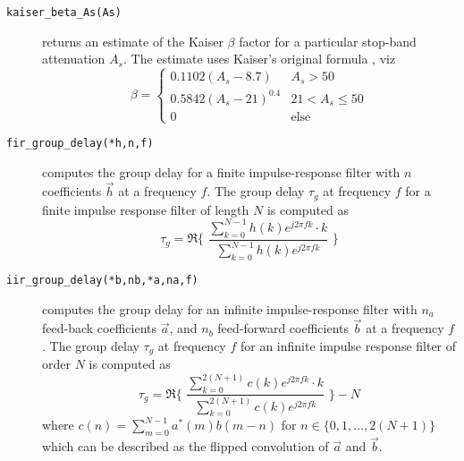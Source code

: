 \begin{description}
\item[{\tt kaiser\_beta\_As(As)}]
    returns an estimate of the Kaiser $\beta$ factor for a particular
    stop-band attenuation $A_s$.
    The estimate uses Kaiser's original formula \cite{Vaidyanathan:1993}, viz
    \begin{equation}
    \label{eqn:filter:firdes:misc:kaiser_beta}
        \beta =
        \begin{cases}
            0.1102 (A_s - 8.7)      &   A_s > 50 \\
            0.5842 (A_s - 21)^{0.4} &   21 < A_s \le 50 \\
            0                       &   \text{else}
        \end{cases}
    \end{equation}

\item[{\tt fir\_group\_delay(*h,n,f)}]
    computes the group delay for a finite impulse-response filter with
    $n$ coefficients $\vec{h}$ at a frequency $f$.
    The group delay $\tau_g$ at frequency $f$
    for a finite impulse response filter of length $N$
    is computed as
    \begin{equation}
    \label{eqn:filter:firdes:misc:fir_group_delay}
        \tau_g = \Re\Biggl\{ \,\,
            \frac{
                \sum_{k=0}^{N-1}{h(k)e^{j 2 \pi f k} \cdot k}
            } {
                \sum_{k=0}^{N-1}{h(k)e^{j 2 \pi f k}}
            }\,\,
            \Biggr\}
    \end{equation}

\item[{\tt iir\_group\_delay(*b,nb,*a,na,f)}]
    computes the group delay for an infinite impulse-response filter
    with $n_a$ feed-back coefficients $\vec{a}$,
    and $n_b$ feed-forward coefficients $\vec{b}$
    at a frequency $f$.
    The group delay $\tau_g$ at frequency $f$ for an infinite impulse
    response filter of order $N$ is computed as
    \begin{equation}
    \label{eqn:filter:firdes:misc:iir_group_delay}
        \tau_g = \Re\Biggl\{ \,\,
            \frac{
                \sum_{k=0}^{2(N+1)}{c(k)e^{j 2 \pi f k} \cdot k}
            } {
                \sum_{k=0}^{2(N+1)}{c(k)e^{j 2 \pi f k}}
            }\,\,
            \Biggr\}
            - N
    \end{equation}
    where $c(n) = \sum_{m=0}^{N-1}{a^*(m) b(m-n)}$
    for $n \in \{0,1,\ldots,2(N+1)\}$
    which can be described as the flipped convolution of $\vec{a}$ and
    $\vec{b}$.


\end{description}
